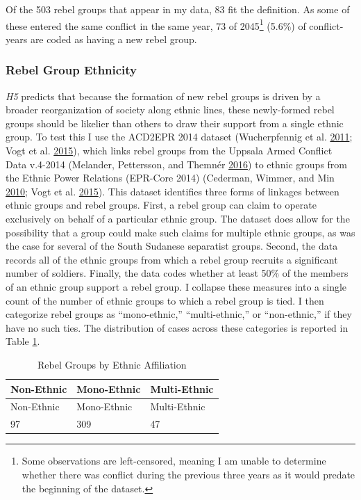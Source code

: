 \documentclass[12pt,]{book}
\let\rmarkdownfootnote\footnote%
\def\footnote{\protect\rmarkdownfootnote}
\theoremstyle{definition}
\theoremstyle{definition}
\theoremstyle{definition}
\theoremstyle{remark}
\begin{document}
Of the 503 rebel groups that appear in my data, 83 fit the definition.
As some of these entered the same conflict in the same year, 73 of
2045\footnote{Some observations are left-censored, meaning I am unable
  to determine whether there was conflict during the previous three
  years as it would predate the beginning of the dataset.} (5.6\%) of
conflict-years are coded as having a new rebel group.

\hypertarget{rebel-group-ethnicity}{%
\subsubsection*{Rebel Group Ethnicity}\label{rebel-group-ethnicity}}

\emph{H5} predicts that because the formation of new rebel groups is
driven by a broader reorganization of society along ethnic lines, these
newly-formed rebel groups should be likelier than others to draw their
support from a single ethnic group. To test this I use the ACD2EPR 2014
dataset (Wucherpfennig et al.
\protect\hyperlink{ref-Wucherpfennig2011}{2011}; Vogt et al.
\protect\hyperlink{ref-Vogt2015}{2015}), which links rebel groups from
the Uppsala Armed Conflict Data v.4-2014 (Melander, Pettersson, and
Themnér \protect\hyperlink{ref-Melander2016}{2016}) to ethnic groups
from the Ethnic Power Relations (EPR-Core 2014) (Cederman, Wimmer, and
Min \protect\hyperlink{ref-Cederman2010}{2010}; Vogt et al.
\protect\hyperlink{ref-Vogt2015}{2015}). This dataset identifies three
forms of linkages between ethnic groups and rebel groups. First, a rebel
group can claim to operate exclusively on behalf of a particular ethnic
group. The dataset does allow for the possibility that a group could
make such claims for multiple ethnic groups, as was the case for several
of the South Sudanese separatist groups. Second, the data records all of
the ethnic groups from which a rebel group recruits a significant number
of soldiers. Finally, the data codes whether at least 50\% of the
members of an ethnic group support a rebel group. I collapse these
measures into a single count of the number of ethnic groups to which a
rebel group is tied. I then categorize rebel groups as ``mono-ethnic,''
``multi-ethnic,'' or ``non-ethnic,'' if they have no such ties. The
distribution of cases across these categories is reported in Table
\ref{tab:acd2epr}.

\begin{longtable}[]{@{}lll@{}}
\caption{\label{tab:acd2epr} Rebel Groups by Ethnic
Affiliation}\tabularnewline
\toprule
Non-Ethnic & Mono-Ethnic & Multi-Ethnic\tabularnewline
\midrule
\endfirsthead
\toprule
Non-Ethnic & Mono-Ethnic & Multi-Ethnic\tabularnewline
\midrule
\endhead
97 & 309 & 47\tabularnewline
\bottomrule
\end{longtable}
\end{document}
